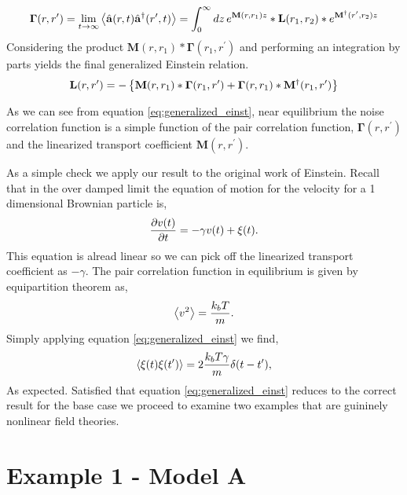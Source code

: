 %
\begin{equation}
    \mathbf{\Gamma}(r, r^\prime) = \lim_{t\rightarrow\infty}
    \left\langle \hat{\mathbf{a}}(r, t)\hat{\mathbf{a}}^\dagger(r^\prime, t) \right\rangle =
    \int_0^\infty dz \,e^{\mathbf{M}(r, r_1)z}\ast\mathbf{L}(r_1, r_2)\ast
    e^{\mathbf{M}^\dagger(r^\prime, r_2)z}
\end{equation}
%
Considering the product $\mathbf{M}(r, r_1)\ast\mathbf{\Gamma}(r_1, r^\prime)$
and performing an integration by parts yields the final generalized Einstein
relation.
%
\begin{equation}
    \label{eq:generalized_einst} 
    \mathbf{L}(r, r^\prime) = - \left\lbrace
          \mathbf{M}(r, r_1) 
     \ast \mathbf{\Gamma}(r_1, r^\prime) 
        + \mathbf{\Gamma}(r, r_1)
     \ast \mathbf{M}^\dagger(r_1, r^\prime) \right\rbrace
\end{equation}
%

As we can see from equation \ref{eq:generalized_einst}, near equilibrium the
noise correlation function is a simple function of the pair correlation
function, $\mathbf{\Gamma}(r, r^\prime)$ and the linearized transport
coefficient $\mathbf{M}(r, r^\prime)$.

As a simple check we apply our result to the original work of Einstein. Recall
that in the over damped limit the equation of motion for the velocity for a 1
dimensional Brownian particle is,
%
\begin{equation}
    \frac{\partial v(t)}{\partial t} = -\gamma v (t) + \xi(t).
\end{equation}
%
This equation is alread linear so we can pick off the linearized transport
coefficient as $-\gamma$. The pair correlation function in equilibrium is given
by equipartition theorem as,
%
\begin{equation}
    \left\langle v^2 \right\rangle = \frac{k_b T}{m}.
\end{equation}
%
Simply applying equation \ref{eq:generalized_einst} we find,
%
\begin{equation}
    \left\langle \xi(t)\xi(t^\prime) \right\rangle = 2 \frac{k_b T \gamma}{m} \delta(t - t^\prime),
\end{equation}
%
As expected. Satisfied that equation \ref{eq:generalized_einst} reduces to 
the correct result for the base case we proceed to examine two examples
that are guininely nonlinear field theories.

\section{Example 1 - Model A} %


